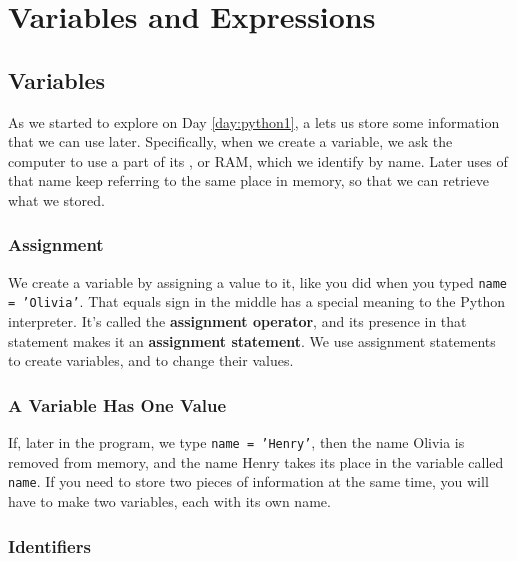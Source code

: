 
\chapter{Variables and Expressions}


\minitoc

\section{Variables}

As we started to explore on Day \ref{day:python1}, a  lets us store some information that we can use later.  Specifically, when we create a variable, we ask the computer to use a part of its , or RAM, which we identify by name.  Later uses of that name keep referring to the same place in memory, so that we can retrieve what we stored.

\subsection{Assignment}

We create a variable by assigning a value to it, like you did when you typed \texttt{name = 'Olivia'}.  That equals sign in the middle has a special meaning to the Python interpreter.  It's called the \textbf{assignment operator}, and its presence in that statement makes it an \textbf{assignment statement}.  We use assignment statements to create variables, and to change their values.

\subsection{A Variable Has One Value}

If, later in the program, we type \texttt{name = 'Henry'}, then the name Olivia is removed from memory, and the name Henry takes its place in the variable called \texttt{name}.  If you need to store two pieces of information at the same time, you will have to make two variables, each with its own name.

\subsection{Identifiers}

